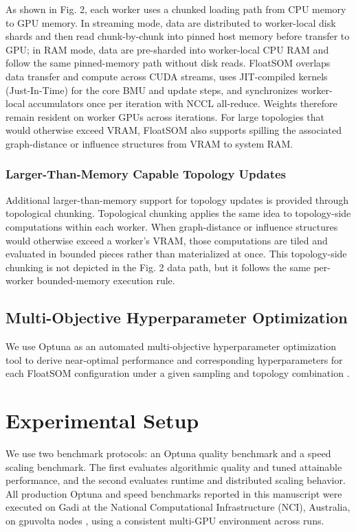 \documentclass[10pt]{article} %
\begin{document}
As shown in Fig. 2, each worker uses a chunked loading path from CPU memory to GPU memory. In streaming mode, data are distributed to worker-local disk shards and then read chunk-by-chunk into pinned host memory before transfer to GPU; in RAM mode, data are pre-sharded into worker-local CPU RAM and follow the same pinned-memory path without disk reads. FloatSOM overlaps data transfer and compute across CUDA streams, uses JIT-compiled kernels (Just-In-Time) for the core BMU and update steps, and synchronizes worker-local accumulators once per iteration with NCCL all-reduce. Weights therefore remain resident on worker GPUs across iterations. For large topologies that would otherwise exceed VRAM, FloatSOM also supports spilling the associated graph-distance or influence structures from VRAM to system RAM.

\subsubsection{Larger-Than-Memory Capable Topology Updates}

Additional larger-than-memory support for topology updates is provided through topological chunking. Topological chunking applies the same idea to topology-side computations within each worker. When graph-distance or influence structures would otherwise exceed a worker's VRAM, those computations are tiled and evaluated in bounded pieces rather than materialized at once. This topology-side chunking is not depicted in the Fig. 2 data path, but it follows the same per-worker bounded-memory execution rule.

\subsection{Multi-Objective Hyperparameter Optimization}

We use Optuna as an automated multi-objective hyperparameter optimization tool to derive near-optimal performance and corresponding hyperparameters for each FloatSOM configuration under a given sampling and topology combination \citep{akibaOptunaNextgenerationHyperparameter2019}.

\section{Experimental Setup}

We use two benchmark protocols: an Optuna quality benchmark and a speed scaling benchmark. The first evaluates algorithmic quality and tuned attainable performance, and the second evaluates runtime and distributed scaling behavior. All production Optuna and speed benchmarks reported in this manuscript were executed on Gadi at the National Computational Infrastructure (NCI), Australia, on gpuvolta nodes \citep{HPCSystemsNCI}, using a consistent multi-GPU environment across runs.
\end{document}
